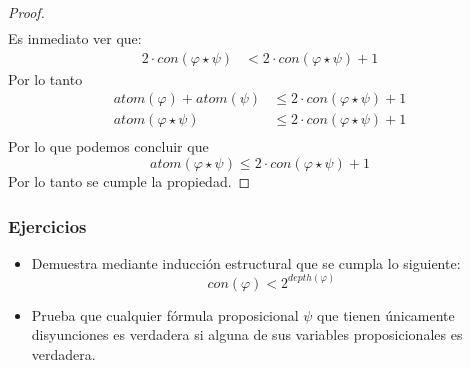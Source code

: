 \documentclass[a4paper]{article}
\begin{document}
\begin{proof}
\begin{align*}
    \end{align*}
    Es inmediato ver que:
    \begin{align*}
        2 \cdot con\left(\varphi \star \psi\right) &< 2 \cdot con\left(\varphi \star \psi\right) + 1
    \end{align*}
    Por lo tanto
    \begin{align*}
        atom\left(\varphi\right) + atom\left(\psi\right) &\leq 2 \cdot con\left(\varphi \star \psi\right) + 1 \\
        atom\left(\varphi \star \psi\right) &\leq 2 \cdot con\left(\varphi \star \psi\right) + 1 \\
    \end{align*}
    Por lo que podemos concluir que
    \[
        atom\left(\varphi \star \psi\right) \leq 2 \cdot con\left(\varphi \star \psi\right) + 1
    \]
    Por lo tanto se cumple la propiedad.
\end{proof}
\subsubsection{Ejercicios}
\noindent
\begin{itemize}
    \item Demuestra mediante inducción estructural que se cumpla lo siguiente:
    \[
        con\left(\varphi\right) < 2^{depth\left(\varphi\right)}
    \]
    \item Prueba que cualquier fórmula proposicional \(\psi\) que tienen únicamente disyunciones
    es verdadera si alguna de sus variables proposicionales es verdadera.
\end{itemize}
\end{document}
